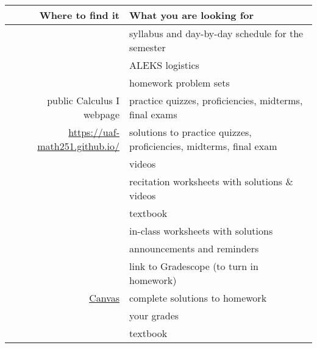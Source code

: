 \documentclass[12pt]{article}
\begin{document}
\begin{table}[h]
\centering
\begin{tabular}{rl}
Where to find it&What you are looking for\\
\hline \hline
&syllabus and day-by-day schedule for the semester\\
&ALEKS logistics\\
&homework problem sets\\
public Calculus I webpage&practice quizzes, proficiencies, midterms, final exams\\
\href{https://uaf-math251.github.io/}{https://uaf-math251.github.io/}&solutions to practice quizzes, proficiencies, midterms, final exam\\
&videos\\
&recitation worksheets with solutions \& videos\\
&textbook\\
&in-class worksheets with solutions\\
\hline
&announcements and reminders\\
&link to Gradescope (to turn in homework)\\
\href{https://www.uaf.edu/uaf/current/canvas.php}{Canvas}& complete solutions to homework\\
& your grades\\
&textbook\\
\end{tabular}
\end{table}
\end{document}

